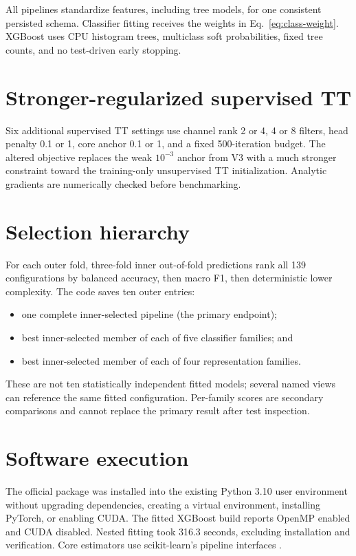All pipelines standardize features, including tree models, for one consistent
persisted schema. Classifier fitting receives the weights in
Eq.~\ref{eq:class-weight}. XGBoost uses CPU histogram trees, multiclass soft
probabilities, fixed tree counts, and no test-driven early stopping.

\section{Stronger-regularized supervised TT}

Six additional supervised TT settings use channel rank 2 or 4, 4 or 8 filters,
head penalty 0.1 or 1, core anchor 0.1 or 1, and a fixed 500-iteration budget.
The altered objective replaces the weak $10^{-3}$ anchor from V3 with a much
stronger constraint toward the training-only unsupervised TT initialization.
Analytic gradients are numerically checked before benchmarking.

\section{Selection hierarchy}

For each outer fold, three-fold inner out-of-fold predictions rank all 139
configurations by balanced accuracy, then macro F1, then deterministic lower
complexity. The code saves ten outer entries:

\begin{itemize}
  \item one complete inner-selected pipeline (the primary endpoint);
  \item best inner-selected member of each of five classifier families; and
  \item best inner-selected member of each of four representation families.
\end{itemize}

These are not ten statistically independent fitted models; several named views
can reference the same fitted configuration. Per-family scores are secondary
comparisons and cannot replace the primary result after test inspection.

\section{Software execution}

The official  package was installed into the existing
Python 3.10 user environment without upgrading dependencies, creating a virtual
environment, installing PyTorch, or enabling CUDA. The fitted XGBoost build
reports OpenMP enabled and CUDA disabled. Nested fitting took 316.3 seconds,
excluding installation and verification. Core estimators use scikit-learn's
pipeline interfaces \citep{pedregosa2011sklearn}.

